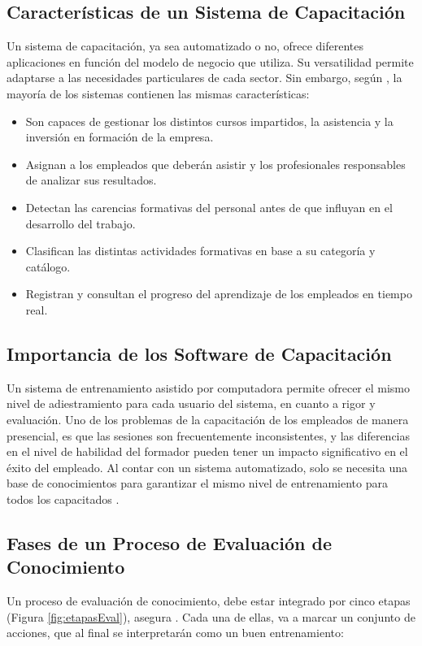 \subsection{Características de un Sistema de Capacitación}
Un sistema de capacitación, ya sea automatizado o no, ofrece diferentes aplicaciones en función del modelo de negocio que utiliza. Su versatilidad permite adaptarse a las necesidades particulares de cada sector. Sin embargo, según \cite{softDoit}, la mayoría de los sistemas contienen las mismas características:
\begin{itemize}
\item Son capaces de gestionar los distintos cursos impartidos, la asistencia y la inversión en formación de la empresa.
\item Asignan a los empleados que deberán asistir y los profesionales responsables de analizar sus resultados.
\item Detectan las carencias formativas del personal antes de que influyan en el desarrollo del trabajo.
\item Clasifican las distintas actividades formativas en base a su categoría y catálogo.
\item Registran y consultan el progreso del aprendizaje de los empleados en tiempo real.
\end{itemize}

\subsection{Importancia de los Software de Capacitación}
Un sistema de entrenamiento asistido por computadora permite ofrecer el mismo nivel de adiestramiento para cada usuario del sistema, en cuanto a rigor y evaluación. Uno de los problemas de la capacitación de los empleados de manera presencial, es que las sesiones son frecuentemente inconsistentes, y las diferencias en el nivel de habilidad del formador pueden tener un impacto significativo en el éxito del empleado. Al contar con un sistema automatizado, solo se necesita una base de conocimientos para garantizar el mismo nivel de entrenamiento para todos los capacitados \cite{cap2002}.

\subsection{Fases de un Proceso de Evaluación de Conocimiento}
Un proceso de evaluación de conocimiento, debe estar integrado por cinco etapas (Figura \ref{fig:etapasEval}), asegura \cite{garcia1994}. Cada una de ellas, va a marcar un conjunto de acciones, que al final se interpretarán como un buen entrenamiento:

